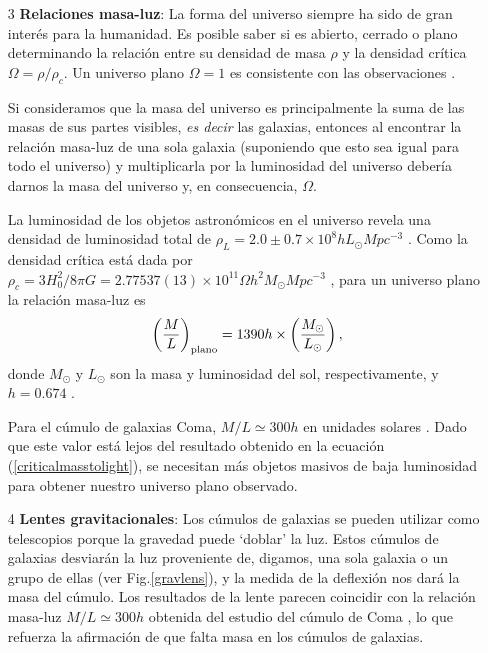 \begin{itemize}
    
    \item[3] \textbf{Relaciones masa-luz}: La forma del universo siempre ha sido de gran interés para la humanidad. Es posible saber si es abierto, cerrado o plano determinando la relación entre su densidad de masa $\rho$ y la densidad crítica $\Omega=\rho/\rho_c$. Un universo plano $\Omega = 1$ es consistente con las observaciones \cite{Workman:2022ynf}. 
    
    Si consideramos que la masa del universo es principalmente la suma de las masas de sus partes visibles, {\it es decir} las galaxias, entonces al encontrar la relación masa-luz de una sola galaxia (suponiendo que esto sea igual para todo el universo) y multiplicarla por la luminosidad del universo debería darnos la masa del universo y, en consecuencia, $\Omega$.
    
    La luminosidad de los objetos astronómicos en el universo revela una densidad de luminosidad total de $\rho_L=2.0\pm0.7 \times 10^{8}hL_{\odot}Mpc^{-3}$ \cite{efstathiou1988analysis}. Como la densidad crítica está dada por $\rho_c=3H_0^2/8\pi G=2.775 37(13)\times 10^{11}\Omega h^2 M_{\odot}Mpc^{-3}$ \cite{patrignani2016review}, para un universo plano la relación masa-luz es \cite{peacock1999cosmological}
    \begin{equation}
    \left( \frac{M}{L} \right)_{\rm plano} = 1390h \times \left( \frac{M_\odot}{L_\odot} \right),
    \label{criticalmasstolight}
    \end{equation}
    donde $M_\odot$ y $L_\odot$ son la masa y luminosidad del sol, respectivamente, y $h=0.674$ \cite{Workman:2022ynf}.
    
   Para el cúmulo de galaxias Coma, $M/L\simeq300h$ en unidades solares \cite{zwicky,zwicky2009republication}. Dado que este valor está lejos del resultado obtenido en la ecuación (\ref{criticalmasstolight}), se necesitan más objetos masivos de baja luminosidad para obtener nuestro universo plano observado.



    \item[4] \textbf{Lentes gravitacionales}: Los cúmulos de galaxias se pueden utilizar como telescopios porque la gravedad puede `doblar' la luz. Estos cúmulos de galaxias desviarán la luz proveniente de, digamos, una sola galaxia o un grupo de ellas (ver Fig.\ref{gravlens}), y la medida de la deflexión nos dará la masa del cúmulo. Los resultados de la lente parecen coincidir con la relación masa-luz $M/L \simeq 300h$ obtenida del estudio del cúmulo de Coma \cite{zwicky,zwicky2009republication}, lo que refuerza la afirmación de que falta masa en los cúmulos de galaxias.


\end{itemize}
